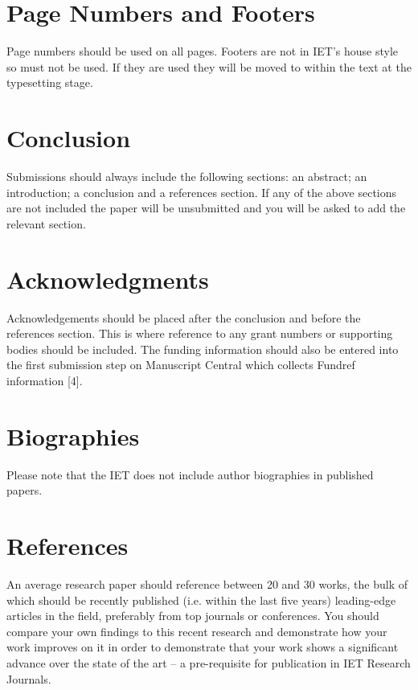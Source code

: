 \documentclass{IET}
\begin{document}
\section{Page Numbers and Footers}

Page numbers should be used on all pages. Footers are not in IET's house
style so must not be used. If they are used they will be moved to within the
text at the typesetting stage.

\section{Conclusion}

Submissions should always include the following sections: an abstract; an
introduction; a conclusion and a references section. If any of the above
sections are not included the paper will be unsubmitted and you will be
asked to add the relevant section.

\section{Acknowledgments}

Acknowledgements should be placed after the conclusion and before the
references section. This is where reference to any grant numbers or
supporting bodies should be included. The funding information should also be
entered into the first submission step on Manuscript Central which collects
Fundref information [4].

\section{Biographies}

Please note that the IET does not include author biographies in published papers.

\section{References}

An average research paper should reference between 20 and 30 works, the bulk
of which should be recently published (i.e. within the last five years)
leading-edge articles in the field, preferably from top journals or
conferences. You should compare your own findings to this recent research
and demonstrate how your work improves on it in order to demonstrate that
your work shows a significant advance over the state of the art -- a
pre-requisite for publication in IET Research Journals.
\end{document}
